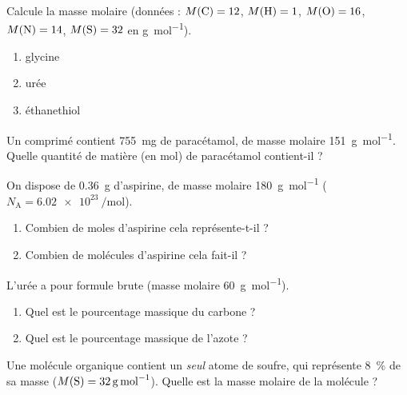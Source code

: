 \documentclass[11pt,a4paper]{article}
\begin{document}
\begin{exo}
Calcule la masse molaire (données : $M(\ce{C})=12$, $M(\ce{H})=1$, $M(\ce{O})=16$, $M(\ce{N})=14$, $M(\ce{S})=32$ en \si{\gram\per\mole}).
\begin{enumerate}[label=\alph*)]
  \item glycine 
  \item urée 
  \item éthanethiol 
\end{enumerate}
\end{exo}

\begin{exo}[Nombre de moles $n=m/M$]
Un comprimé contient \qty{755}{\milli\gram} de paracétamol, de masse molaire \qty{151}{\gram\per\mole}. Quelle quantité de matière (en mol) de paracétamol contient-il ?
\end{exo}

\begin{exo}[Nombre de molécules $N=n\,N_{\mathrm{A}}$]
On dispose de \qty{0.36}{\gram} d'aspirine, de masse molaire \qty{180}{\gram\per\mole} ($N_{\mathrm{A}}=\qty{6.02e23}{\per\mole}$).
\begin{enumerate}[label=\alph*)]
  \item Combien de moles d'aspirine cela représente-t-il ?
  \item Combien de molécules d'aspirine cela fait-il ?
\end{enumerate}
\end{exo}

\begin{exo}
L'urée a pour formule brute  (masse molaire \qty{60}{\gram\per\mole}).
\begin{enumerate}[label=\alph*)]
  \item Quel est le pourcentage massique du carbone ?
  \item Quel est le pourcentage massique de l'azote ?
\end{enumerate}
\end{exo}

\begin{exo}
Une molécule organique contient un \emph{seul} atome de soufre, qui représente \qty{8}{\percent} de sa masse ($M(\ce{S})=\qty{32}{\gram\per\mole}$). Quelle est la masse molaire de la molécule ?
\end{exo}
\end{document}
